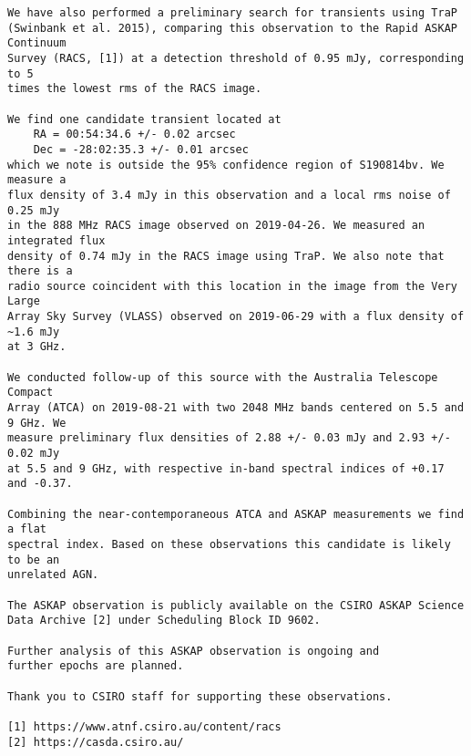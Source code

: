 \pagebreak
\begin{verbatim}
We have also performed a preliminary search for transients using TraP
(Swinbank et al. 2015), comparing this observation to the Rapid ASKAP Continuum
Survey (RACS, [1]) at a detection threshold of 0.95 mJy, corresponding to 5
times the lowest rms of the RACS image.

We find one candidate transient located at
    RA = 00:54:34.6 +/- 0.02 arcsec
    Dec = -28:02:35.3 +/- 0.01 arcsec
which we note is outside the 95% confidence region of S190814bv. We measure a 
flux density of 3.4 mJy in this observation and a local rms noise of 0.25 mJy
in the 888 MHz RACS image observed on 2019-04-26. We measured an integrated flux
density of 0.74 mJy in the RACS image using TraP. We also note that there is a
radio source coincident with this location in the image from the Very Large
Array Sky Survey (VLASS) observed on 2019-06-29 with a flux density of ~1.6 mJy
at 3 GHz.

We conducted follow-up of this source with the Australia Telescope Compact
Array (ATCA) on 2019-08-21 with two 2048 MHz bands centered on 5.5 and 9 GHz. We
measure preliminary flux densities of 2.88 +/- 0.03 mJy and 2.93 +/- 0.02 mJy
at 5.5 and 9 GHz, with respective in-band spectral indices of +0.17 and -0.37.

Combining the near-contemporaneous ATCA and ASKAP measurements we find a flat
spectral index. Based on these observations this candidate is likely to be an
unrelated AGN.

The ASKAP observation is publicly available on the CSIRO ASKAP Science
Data Archive [2] under Scheduling Block ID 9602.

Further analysis of this ASKAP observation is ongoing and
further epochs are planned.

Thank you to CSIRO staff for supporting these observations.

[1] https://www.atnf.csiro.au/content/racs
[2] https://casda.csiro.au/
\end{verbatim}
\pagebreak
{}
